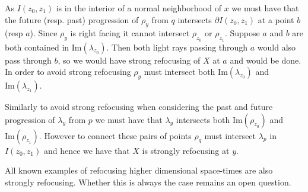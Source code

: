As $I(z_0, z_1)$ is in the interior of a normal neighborhood of $x$ we must have that the future (resp. past) progression of $\rho_y$ from $q$ intersects $\partial I(z_0, z_1)$ at a point $b$ (resp $a$).  Since $\rho_y$ is right facing it cannot intersect $\rho_{z_0}$ or $\rho_{z_1}$.  Suppose $a$ and $b$ are both contained in $\mbox{Im}(\lambda_{z_0})$.  Then both light rays passing through $a$ would also pass through $b$, so we would have strong refocusing of $X$ at $a$ and would be done.  In order to avoid strong refocusing $\rho_y$ must intersect both $\mbox{Im}(\lambda_{z_0})$ and $\mbox{Im}(\lambda_{z_1})$.

Similarly to avoid strong refocusing when considering the past and future progression of $\lambda_y$ from $p$ we must have that $\lambda_y$ intersects both $\mbox{Im}(\rho_{z_0})$ and $\mbox{Im}(\rho_{z_1})$.  However to connect these pairs of points $\rho_q$ must intersect $\lambda_p$ in $I(z_0, z_1)$ and hence we have that $X$ is strongly refocusing at $y$.

\begin{rem}
All known examples of refocusing higher dimensional space-times are also strongly refocusing.  Whether this is always the case remains an open question.
\end{rem}



